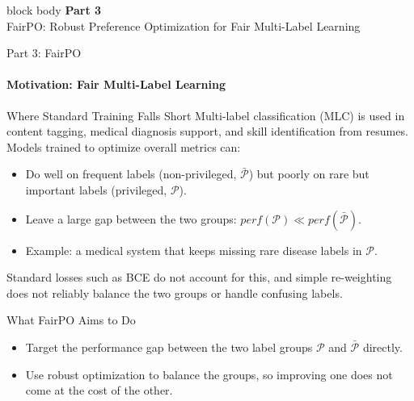 \documentclass[aspectratio=169]{beamer}
\newcommand{\privileged}{\mathcal{P}} %
\newcommand{\nonprivileged}{\bar{\mathcal{P}}} %
\newcommand{\partdivider}[2]{%
	\begin{frame}
		\vspace*{\fill}
		\begin{center}%
			\begin{minipage}{0.9\textwidth}
				\begin{beamercolorbox}[rounded=true,shadow=true,sep=18pt,center]{block body}
					{\color{sectionblue}\Large\textbf{#1}}\\[0.6em]
					{\color{black!70}\normalsize #2}
				\end{beamercolorbox}
			\end{minipage}%
		\end{center}
		\vspace*{\fill}
	\end{frame}%
}
\begin{document}
	
	\partdivider{Part 3}{FairPO: Robust Preference Optimization for Fair Multi-Label Learning}
	
	\begin{frame}{Part 3: FairPO}
		\framesubtitle{Motivation: Fair Multi-Label Learning}
		\begin{block}{\scriptsize Where Standard Training Falls Short}\scriptsize
			Multi-label classification (MLC) is used in content tagging, medical diagnosis support, and skill identification from resumes. Models trained to optimize overall metrics can:
			\begin{itemize}
				\item Do well on frequent labels (non-privileged, $\nonprivileged$) but poorly on rare but important labels (privileged, $\privileged$).
				\item Leave a large gap between the two groups: $perf(\privileged) \ll perf(\nonprivileged)$.
				\item Example: a medical system that keeps missing rare disease labels in $\privileged$.
			\end{itemize}
			Standard losses such as BCE do not account for this, and simple re-weighting does not reliably balance the two groups or handle confusing labels.
		\end{block}
		\begin{block}{\scriptsize What FairPO Aims to Do}\scriptsize
			\begin{itemize}
				\item Target the performance gap between the two label groups $\privileged$ and $\nonprivileged$ directly.
				\item Use robust optimization to balance the groups, so improving one does not come at the cost of the other.
			\end{itemize}
		\end{block}
	\end{frame}
	
\end{document}
